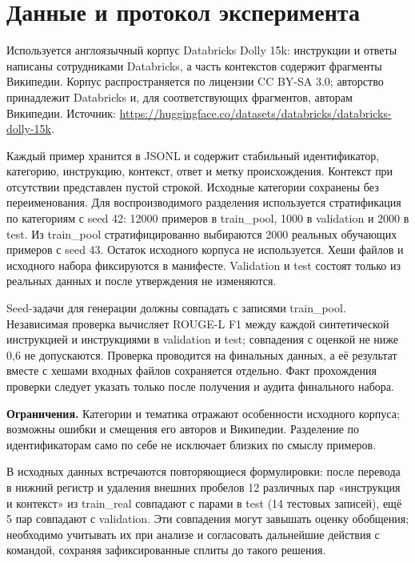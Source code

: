 \section{Данные и протокол эксперимента}
Используется англоязычный корпус Databricks Dolly 15k: инструкции и ответы написаны сотрудниками Databricks, а часть контекстов содержит фрагменты Википедии. Корпус распространяется по лицензии CC BY-SA 3.0; авторство принадлежит Databricks и, для соответствующих фрагментов, авторам Википедии. Источник: \url{https://huggingface.co/datasets/databricks/databricks-dolly-15k}.

Каждый пример хранится в JSONL и содержит стабильный идентификатор, категорию, инструкцию, контекст, ответ и метку происхождения. Контекст при отсутствии представлен пустой строкой. Исходные категории сохранены без переименования. Для воспроизводимого разделения используется стратификация по категориям с seed 42: 12000 примеров в train\_pool, 1000 в validation и 2000 в test. Из train\_pool стратифицированно выбираются 2000 реальных обучающих примеров с seed 43. Остаток исходного корпуса не используется. Хеши файлов и исходного набора фиксируются в манифесте. Validation и test состоят только из реальных данных и после утверждения не изменяются.

Seed-задачи для генерации должны совпадать с записями train\_pool. Независимая проверка вычисляет ROUGE-L F1 между каждой синтетической инструкцией и инструкциями в validation и test; совпадения с оценкой не ниже 0,6 не допускаются. Проверка проводится на финальных данных, а её результат вместе с хешами входных файлов сохраняется отдельно. Факт прохождения проверки следует указать только после получения и аудита финального набора.

\textbf{Ограничения.} Категории и тематика отражают особенности исходного корпуса; возможны ошибки и смещения его авторов и Википедии. Разделение по идентификаторам само по себе не исключает близких по смыслу примеров.

В исходных данных встречаются повторяющиеся формулировки: после перевода в нижний регистр и удаления внешних пробелов 12 различных пар «инструкция и контекст» из train\_real совпадают с парами в test (14 тестовых записей), ещё 5 пар совпадают с validation. Эти совпадения могут завышать оценку обобщения; необходимо учитывать их при анализе и согласовать дальнейшие действия с командой, сохраняя зафиксированные сплиты до такого решения.

